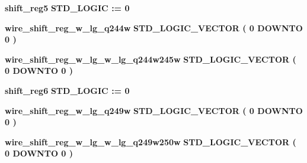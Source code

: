 \begin{DoxyCompactItemize}
\item 
{\bf shift\+\_\+reg5} {\bfseries \textcolor{comment}{S\+T\+D\+\_\+\+L\+O\+G\+IC}\textcolor{vhdlchar}{ }\textcolor{vhdlchar}{ }\textcolor{vhdlchar}{\+:}\textcolor{vhdlchar}{=}\textcolor{vhdlchar}{ }\textcolor{vhdlchar}{ }\textcolor{vhdlchar}{\textquotesingle{}}\textcolor{vhdlchar}{ } \textcolor{vhdldigit}{0} \textcolor{vhdlchar}{ }\textcolor{vhdlchar}{\textquotesingle{}}\textcolor{vhdlchar}{ }} 
\item 
{\bf wire\+\_\+shift\+\_\+reg\+\_\+w\+\_\+lg\+\_\+q244w} {\bfseries \textcolor{comment}{S\+T\+D\+\_\+\+L\+O\+G\+I\+C\+\_\+\+V\+E\+C\+T\+OR}\textcolor{vhdlchar}{ }\textcolor{vhdlchar}{(}\textcolor{vhdlchar}{ }\textcolor{vhdlchar}{ } \textcolor{vhdldigit}{0} \textcolor{vhdlchar}{ }\textcolor{keywordflow}{D\+O\+W\+N\+TO}\textcolor{vhdlchar}{ }\textcolor{vhdlchar}{ } \textcolor{vhdldigit}{0} \textcolor{vhdlchar}{ }\textcolor{vhdlchar}{)}\textcolor{vhdlchar}{ }} 
\item 
{\bf wire\+\_\+shift\+\_\+reg\+\_\+w\+\_\+lg\+\_\+w\+\_\+lg\+\_\+q244w245w} {\bfseries \textcolor{comment}{S\+T\+D\+\_\+\+L\+O\+G\+I\+C\+\_\+\+V\+E\+C\+T\+OR}\textcolor{vhdlchar}{ }\textcolor{vhdlchar}{(}\textcolor{vhdlchar}{ }\textcolor{vhdlchar}{ } \textcolor{vhdldigit}{0} \textcolor{vhdlchar}{ }\textcolor{keywordflow}{D\+O\+W\+N\+TO}\textcolor{vhdlchar}{ }\textcolor{vhdlchar}{ } \textcolor{vhdldigit}{0} \textcolor{vhdlchar}{ }\textcolor{vhdlchar}{)}\textcolor{vhdlchar}{ }} 
\item 
{\bf shift\+\_\+reg6} {\bfseries \textcolor{comment}{S\+T\+D\+\_\+\+L\+O\+G\+IC}\textcolor{vhdlchar}{ }\textcolor{vhdlchar}{ }\textcolor{vhdlchar}{\+:}\textcolor{vhdlchar}{=}\textcolor{vhdlchar}{ }\textcolor{vhdlchar}{ }\textcolor{vhdlchar}{\textquotesingle{}}\textcolor{vhdlchar}{ } \textcolor{vhdldigit}{0} \textcolor{vhdlchar}{ }\textcolor{vhdlchar}{\textquotesingle{}}\textcolor{vhdlchar}{ }} 
\item 
{\bf wire\+\_\+shift\+\_\+reg\+\_\+w\+\_\+lg\+\_\+q249w} {\bfseries \textcolor{comment}{S\+T\+D\+\_\+\+L\+O\+G\+I\+C\+\_\+\+V\+E\+C\+T\+OR}\textcolor{vhdlchar}{ }\textcolor{vhdlchar}{(}\textcolor{vhdlchar}{ }\textcolor{vhdlchar}{ } \textcolor{vhdldigit}{0} \textcolor{vhdlchar}{ }\textcolor{keywordflow}{D\+O\+W\+N\+TO}\textcolor{vhdlchar}{ }\textcolor{vhdlchar}{ } \textcolor{vhdldigit}{0} \textcolor{vhdlchar}{ }\textcolor{vhdlchar}{)}\textcolor{vhdlchar}{ }} 
\item 
{\bf wire\+\_\+shift\+\_\+reg\+\_\+w\+\_\+lg\+\_\+w\+\_\+lg\+\_\+q249w250w} {\bfseries \textcolor{comment}{S\+T\+D\+\_\+\+L\+O\+G\+I\+C\+\_\+\+V\+E\+C\+T\+OR}\textcolor{vhdlchar}{ }\textcolor{vhdlchar}{(}\textcolor{vhdlchar}{ }\textcolor{vhdlchar}{ } \textcolor{vhdldigit}{0} \textcolor{vhdlchar}{ }\textcolor{keywordflow}{D\+O\+W\+N\+TO}\textcolor{vhdlchar}{ }\textcolor{vhdlchar}{ } \textcolor{vhdldigit}{0} \textcolor{vhdlchar}{ }\textcolor{vhdlchar}{)}\textcolor{vhdlchar}{ }} 

\end{DoxyCompactItemize}
